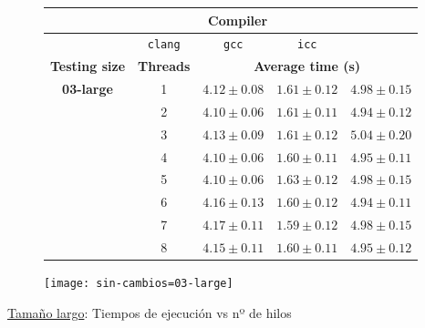 \begin{figure}[H]
    \centering
    \begin{subfigure}{0.4\textwidth}
        \begin{adjustbox}{width=\textwidth} 
        \begin{tabular}{|c|c|c|c|c|}
            \hline
            \rowcolor{azul} \multicolumn{2}{|c|}{}&\multicolumn{3}{c|}{\textbf{Compiler}} \\ \hline
            \rowcolor{azul} \multicolumn{2}{|c|}{}&\texttt{clang}&\texttt{gcc}&\texttt{icc}\\ \hline
            \rowcolor{azul} \textbf{Testing size} & \textbf{Threads}&\multicolumn{3}{c|}{\textbf{Average time (s)}} \\ \hline
            \multirow{8}{1cm}{\textbf{03-large}} & 1 & \(4.12\pm{0.08}\) & \(1.61\pm{0.12}\) & \(4.98\pm{0.15}\) \\ \cline{2-5}
            & 2 & \(4.10\pm{0.06}\) & \(1.61\pm{0.11}\) & \(4.94\pm{0.12}\) \\ \cline{2-5}
            & 3 & \(4.13\pm{0.09}\) & \(1.61\pm{0.12}\) & \(5.04\pm{0.20}\) \\ \cline{2-5}
            & 4 & \(4.10\pm{0.06}\) & \(1.60\pm{0.11}\) & \(4.95\pm{0.11}\) \\ \cline{2-5}
            & 5 & \(4.10\pm{0.06}\) & \(1.63\pm{0.12}\) & \(4.98\pm{0.15}\) \\ \cline{2-5}
            & 6 & \(4.16\pm{0.13}\) & \(1.60\pm{0.12}\) & \(4.94\pm{0.11}\) \\ \cline{2-5}
            & 7 & \(4.17\pm{0.11}\) & \(1.59\pm{0.12}\) & \(4.98\pm{0.15}\) \\ \cline{2-5}
            & 8 & \(4.15\pm{0.11}\) & \(1.60\pm{0.11}\) & \(4.95\pm{0.12}\) \\ \hline
        \end{tabular}
        \end{adjustbox}
    \end{subfigure}
    \hfill
    \begin{subfigure}{0.5\textwidth}
        \texttt{[image: sin-cambios=03-large]}
    \end{subfigure}
    \caption{\underline{Tamaño largo}: Tiempos de ejecución vs nº de hilos}
    \label{sin-cambios=03-large}
\end{figure}
